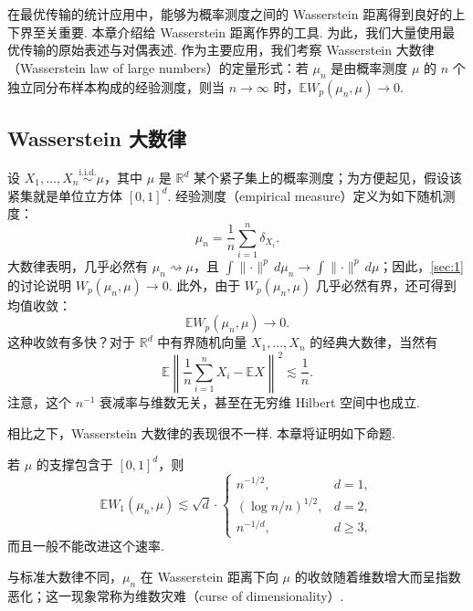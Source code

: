 在最优传输的统计应用中，能够为概率测度之间的 Wasserstein 距离得到良好的上下界至关重要. 本章介绍给 Wasserstein 距离作界的工具. 为此，我们大量使用最优传输的原始表述与对偶表述. 作为主要应用，我们考察 Wasserstein 大数律（Wasserstein law of large numbers）的定量形式：若 $\mu_n$ 是由概率测度 $\mu$ 的 $n$ 个独立同分布样本构成的经验测度，则当 $n\to\infty$ 时，$\mathbb E W_p(\mu_n,\mu)\to0$.

\subsection{Wasserstein 大数律}\label{sec:2.1}
设 $X_1,\ldots,X_n\overset{\mathrm{i.i.d.}}\sim\mu$，其中 $\mu$ 是 $\mathbb R^d$ 某个紧子集上的概率测度；为方便起见，假设该紧集就是单位立方体 $[0,1]^d$. 经验测度（empirical measure）定义为如下随机测度：
$$\mu_n=\frac1n\sum_{i=1}^n\delta_{X_i}.$$
大数律表明，几乎必然有 $\mu_n\rightsquigarrow\mu$，且 $\int\lVert\cdot\rVert^p\,d\mu_n\to\int\lVert\cdot\rVert^p\,d\mu$；因此，\autoref{sec:1}的讨论说明 $W_p(\mu_n,\mu)\to0$. 此外，由于 $W_p(\mu_n,\mu)$ 几乎必然有界，还可得到均值收敛：
$$\mathbb E W_p(\mu_n,\mu)\to0.$$
这种收敛有多快？对于 $\mathbb R^d$ 中有界随机向量 $X_1,\ldots,X_n$ 的经典大数律，当然有
$$\mathbb E\left\lVert\frac1n\sum_{i=1}^n X_i-\mathbb EX\right\rVert^2\lesssim\frac1n.$$
注意，这个 $n^{-1}$ 衰减率与维数无关，甚至在无穷维 Hilbert 空间中也成立.

相比之下，Wasserstein 大数律的表现很不一样. 本章将证明如下命题.
\begin{proposition}\label{prop:2.1}
若 $\mu$ 的支撑包含于 $[0,1]^d$，则
\begin{equation}\label{eq:2.1}
\mathbb E W_1(\mu_n,\mu)\lesssim\sqrt d\cdot
\begin{cases}
n^{-1/2},&d=1,\\
(\log n/n)^{1/2},&d=2,\\
n^{-1/d},&d\ge3,
\end{cases}
\end{equation}
而且一般不能改进这个速率.
\end{proposition}
与标准大数律不同，$\mu_n$ 在 Wasserstein 距离下向 $\mu$ 的收敛随着维数增大而呈指数恶化；这一现象常称为维数灾难（curse of dimensionality）.
